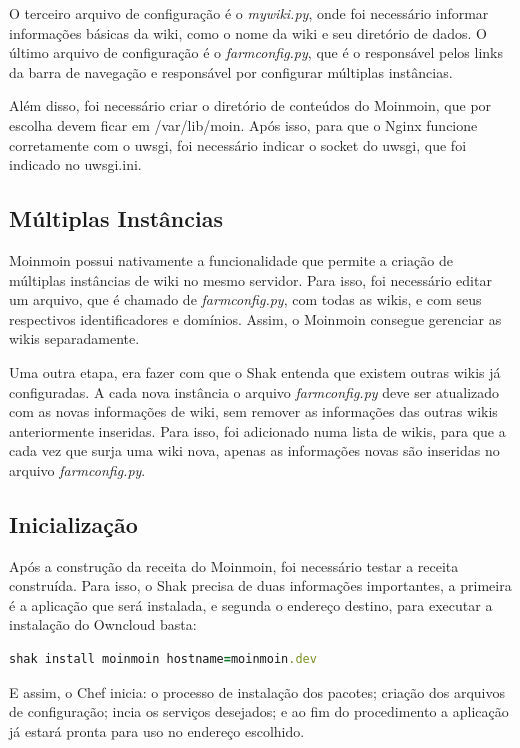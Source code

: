 O terceiro arquivo de configuração é o \textit{mywiki.py}, onde foi necessário
informar informações básicas da wiki, como o nome da wiki e seu diretório de dados. 
O último arquivo de configuração é o \textit{farmconfig.py}, que é o responsável pelos 
links da barra de navegação e responsável por configurar múltiplas instâncias.

Além disso, foi necessário criar o diretório de conteúdos do Moinmoin, que por
escolha devem ficar em /var/lib/moin. Após isso, para que o Nginx funcione corretamente
com o uwsgi, foi necessário indicar o socket do uwsgi, que foi indicado no uwsgi.ini.

\subsection{Múltiplas Instâncias}

Moinmoin possui nativamente a funcionalidade que permite a criação de múltiplas 
instâncias de wiki no mesmo servidor. Para isso, foi necessário editar um arquivo,
que é chamado de \textit{farmconfig.py}, com todas as wikis, e com seus 
respectivos identificadores e domínios. Assim, o Moinmoin consegue gerenciar as 
wikis separadamente. 

Uma outra etapa, era fazer com que o Shak entenda que existem outras wikis já 
configuradas. A cada nova instância
o arquivo \textit{farmconfig.py} deve ser atualizado com as novas 
informações de wiki, sem remover as
informações das outras wikis anteriormente inseridas. Para isso, foi adicionado
numa lista de wikis, para que a cada vez que surja uma wiki nova, apenas as
informações novas são inseridas no arquivo \textit{farmconfig.py}.

\subsection{Inicialização}

Após a construção da receita do Moinmoin, foi necessário testar a receita construída. Para 
isso, o Shak precisa de duas informações importantes, a primeira é a aplicação
que será instalada, e segunda o endereço destino, para executar a instalação
do Owncloud basta:

\begin{lstlisting}[language=Ruby,label=dice_index,caption={Exemplo de execução de instalação do owncloud com shak}]
shak install moinmoin hostname=moinmoin.dev
\end{lstlisting}

E assim, o Chef inicia: o processo de instalação dos pacotes; criação dos arquivos
de configuração; incia os serviços desejados; e ao fim do procedimento a aplicação
já estará pronta para uso no endereço escolhido.

